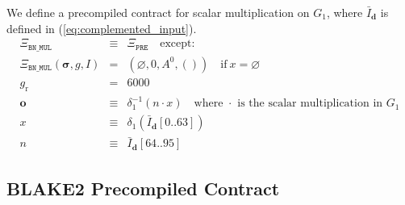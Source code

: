 \documentclass[9pt,oneside]{amsart}
\begin{document}
We define a precompiled contract for scalar multiplication on $G_1$, where $\bar I_{\mathbf{d}}$ is defined in (\ref{eq:complemented_input}).
\begin{eqnarray}
\Xi_{\mathtt{BN\_MUL}}&\equiv&\Xi_{\mathtt{PRE}}\quad\text{except:}\\
\Xi_{\mathtt{BN\_MUL}}(\boldsymbol\sigma,g,I)&=&\left(\varnothing,0,A^0,()\right)\quad\text{if}\ x=\varnothing\\
g_{\mathrm{r}} &=& 6000\\
\mathbf{o}&\equiv&\delta_1^{-1}(n\cdot x)\quad\text{where $\cdot$ is the scalar multiplication in $G_1$}\\
x&\equiv&\delta_1\left(\bar I_{\mathbf{d}}[0..63]\right)\\
n&\equiv&\bar I_{\mathbf{d}}[64..95]
\end{eqnarray}

\subsection{BLAKE2 Precompiled Contract}
\end{document}
